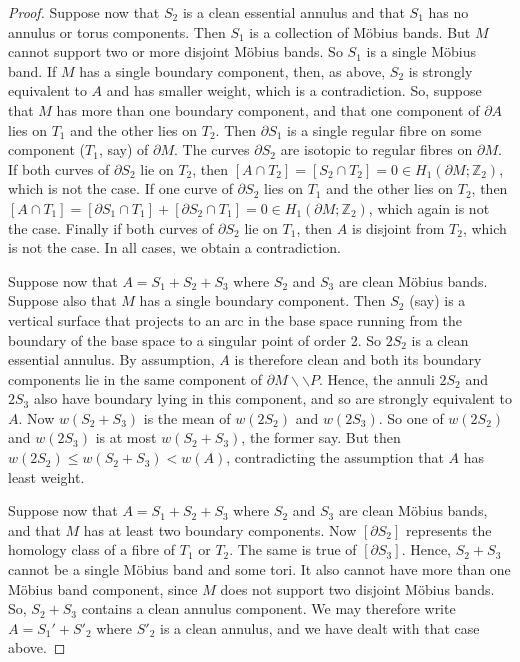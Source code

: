 \documentclass[oneside]{amsart}
\numberwithin{equation}{section}
\theoremstyle{plain}
\theoremstyle{definition}
\newcommand{\cut}{\backslash\backslash}
\begin{document}
\begin{proof}
Suppose now that $S_2$ is a clean essential annulus and that $S_1$ has no annulus or torus components.
Then $S_1$ is a collection of M\"obius bands. But $M$ cannot support two or more disjoint M\"obius bands.
So $S_1$ is a single M\"obius band.
If $M$ has a single boundary component, then, as above, $S_2$ is strongly equivalent to $A$ and has smaller
weight, which is a contradiction. So, suppose that $M$ has more than one boundary component,
and that one component of $\partial A$ lies on $T_1$ and the other lies on $T_2$.
Then $\partial S_1$ is a single regular fibre on some component ($T_1$, say) of
$\partial M$. The curves $\partial S_2$ are isotopic to regular fibres on $\partial M$.
If both curves of $\partial S_2$ lie on $T_2$, then $[A \cap T_2] = [S_2 \cap T_2] = 0 \in H_1(\partial M; \mathbb{ Z}_2)$,
which is not the case. If one curve of $\partial S_2$ lies on $T_1$ and the other lies on $T_2$,
then $[A \cap T_1] = [\partial S_1 \cap T_1] + [\partial S_2 \cap T_1] = 0 \in H_1(\partial M; \mathbb{ Z}_2)$, which 
again is not the case.
Finally if both curves of $\partial S_2$ lie on $T_1$, then $A$ is disjoint from $T_2$, which is not the case.
In all cases, we obtain a contradiction.

Suppose now that $A = S_1 + S_2 + S_3$ where $S_2$ and $S_3$ are clean M\"obius bands. Suppose
also that $M$ has a single boundary component.
Then $S_2$ (say) is a vertical surface that projects to an arc in the base space running from
the boundary of the base space to a singular point of order 2. So $2 S_2$ is a clean essential annulus.
By assumption, $A$ is therefore clean and both its boundary components lie in the
same component of $\partial M \cut P$. Hence, the annuli $2S_2$ and $2S_3$
also have boundary lying in this component, and so are strongly equivalent to $A$.
Now $w(S_2 + S_3)$ is the mean of $w(2S_2)$ and $w(2S_3)$.
So one of $w(2S_2)$ and $w(2S_3)$ is at most $w(S_2 + S_3)$, the former say. But
then $w(2S_2) \leq w(S_2 + S_3) < w(A)$, contradicting the assumption that $A$ has least weight.

Suppose now that $A = S_1 + S_2 + S_3$ where $S_2$ and $S_3$ are clean M\"obius bands, and that
$M$ has at least two boundary components. Now $[\partial S_2]$ represents the homology class
of a fibre of $T_1$ or $T_2$. The same is true of $[\partial S_3]$. Hence, $S_2 + S_3$
cannot be a single M\"obius band and some tori. It also cannot have more than one
M\"obius band component, since $M$ does not support two disjoint M\"obius bands.
So, $S_2 + S_3$ contains a clean annulus component. We may therefore write $A = S_1' + S'_2$
where $S'_2$ is a clean annulus, and we have dealt with that case above.

\end{proof}
\end{document}

